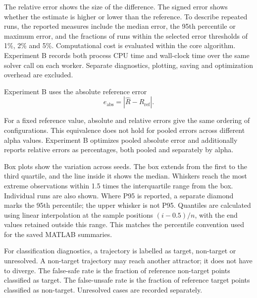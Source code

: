 \begin{bluerevision}
\begin{greenrevision}
The relative error shows the size of the difference. The signed error shows whether the estimate is higher or lower than the reference. To describe repeated runs, the reported measures include the median error, the 95th percentile or maximum error, and the fractions of runs within the selected error thresholds of 1\%, 2\% and 5\%. Computational cost is evaluated within the core algorithm. Experiment B records both process CPU time and wall-clock time over the same solver call on each worker. Separate diagnostics, plotting, saving and optimization overhead are excluded.
\end{greenrevision}
\end{bluerevision}

Experiment B uses the absolute reference error
\begin{equation}
e_{\mathrm{abs}}=|\hat R-R_{\mathrm{ref}}|.
\end{equation}
\begin{bluerevision}
For a fixed reference value, absolute and relative errors give the same ordering of configurations. This equivalence does not hold for pooled errors across different alpha values. Experiment B optimizes pooled absolute error and additionally reports relative errors as percentages, both pooled and separately by alpha.
\end{bluerevision}

Box plots show the variation across seeds. The box extends from the first to the third quartile, and the line inside it shows the median. Whiskers reach the most extreme observations within 1.5 times the interquartile range from the box. Individual runs are also shown. Where P95 is reported, a separate diamond marks the 95th percentile; the upper whisker is not P95. Quantiles are calculated using linear interpolation at the sample positions $(i-0.5)/n$, with the end values retained outside this range. This matches the percentile convention used for the saved MATLAB summaries.

For classification diagnostics, a trajectory is labelled as target, non-target or unresolved. A non-target trajectory may reach another attractor; it does not have to diverge. The false-safe rate is the fraction of reference non-target points classified as target. The false-unsafe rate is the fraction of reference target points classified as non-target. Unresolved cases are recorded separately.

